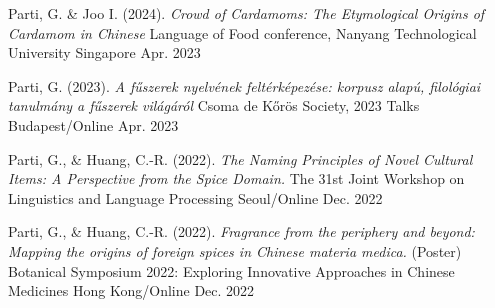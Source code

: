
\begin{cventries}

  \cventry
  {Parti, G. \& Joo I. (2024). \textit{Crowd of Cardamoms: The Etymological Origins of Cardamom in Chinese}} %
  {Language of Food conference, Nanyang Technological University \href{https://www.ntu.edu.sg/soh/news-events/events/detail/2024/01/29/research-events/the-language-of-food-exploring-culinary-communication-and-culture}{\faExternalLink}} %
  {Singapore} %
  {Apr. 2023} %
  {
  }

  

  \cventry
  {Parti, G. (2023). \textit{A fűszerek nyelvének feltérképezése: korpusz alapú, filológiai tanulmány a fűszerek világáról}} %
  {Csoma de Kőrös Society, 2023 Talks  \href{https://www.youtube.com/watch?v=udy1Hrn0wc0}{\faExternalLink}} %
  {Budapest/Online} %
  {Apr. 2023} %
  {
  }

  \cventry
    {Parti, G., \& Huang, C.-R. (2022). \textit{The Naming Principles of Novel Cultural Items: A Perspective from the Spice Domain.}} %
    {The 31st Joint Workshop on Linguistics and Language Processing \href{https://jwllp31.github.io/program/}{\faExternalLink}} %
    {Seoul/Online} %
    {Dec. 2022} %
    {
    }


  \cventry
    {Parti, G., \& Huang, C.-R. (2022). \textit{Fragrance from the periphery and beyond: Mapping the origins of foreign spices in Chinese materia medica.} (Poster)} %
    {Botanical Symposium 2022: Exploring Innovative Approaches in Chinese Medicines \href{https://event.fourwaves.com/botanicalsymposium2022/abstracts/1ea06222-f8a6-400c-8c92-de4e419a56f3}{\faExternalLink}} %
    {Hong Kong/Online} %
    {Dec. 2022} %
    {
    }

\end{cventries}
